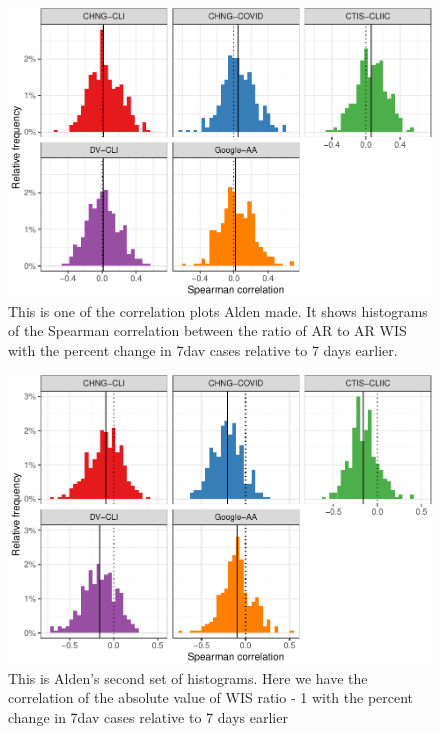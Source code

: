 \documentclass[9pt,twoside,lineno]{pnas-new}
\begin{document}
\clearpage

\begin{figure}

{\centering \includegraphics[width=\textwidth]{fig/cor-wis-ratio-1} 

}

\caption{This is one of the correlation plots Alden made. It shows histograms of the Spearman correlation between the ratio of AR to AR WIS with the percent change in 7dav cases relative to 7 days earlier.}\label{fig:cor-wis-ratio}
\end{figure}

\clearpage

\begin{figure}

{\centering \includegraphics[width=\textwidth]{fig/cor-wis-ratio-m1-1} 

}

\caption{This is Alden's second set of histograms. Here we have the correlation of the absolute value of WIS ratio - 1 with the percent change in 7dav cases relative to 7 days earlier}\label{fig:cor-wis-ratio-m1}
\end{figure}
\end{document}

